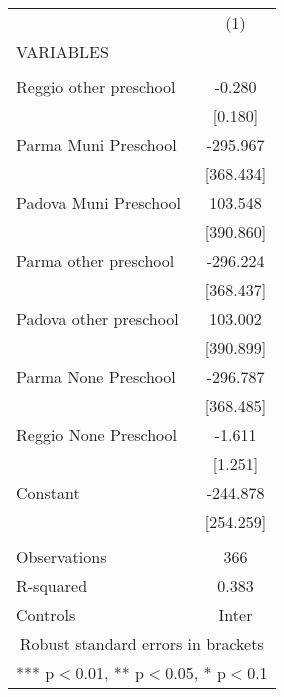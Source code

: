 \begin{tabular}{lc} \hline
 & (1) \\
VARIABLES &  \\ \hline
 &  \\
Reggio other preschool & -0.280 \\
 & [0.180] \\
Parma Muni Preschool & -295.967 \\
 & [368.434] \\
Padova Muni Preschool & 103.548 \\
 & [390.860] \\
Parma other preschool & -296.224 \\
 & [368.437] \\
Padova other preschool & 103.002 \\
 & [390.899] \\
Parma None Preschool & -296.787 \\
 & [368.485] \\
Reggio None Preschool & -1.611 \\
 & [1.251] \\
Constant & -244.878 \\
 & [254.259] \\
 &  \\
Observations & 366 \\
R-squared & 0.383 \\
 Controls & Inter \\ \hline
\multicolumn{2}{c}{ Robust standard errors in brackets} \\
\multicolumn{2}{c}{ *** p$<$0.01, ** p$<$0.05, * p$<$0.1} \\
\end{tabular}
